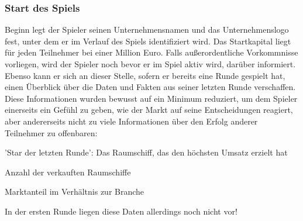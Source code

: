 \subsubsection{Start des Spiels}
\label{sub:spielwelt-regeln-informationsphase-start_des_spiels}

Beginn legt der Spieler seinen Unternehmensnamen und das Unternehmenslogo fest, unter dem er im Verlauf des Spiels identifiziert wird. Das Startkapital liegt für jeden Teilnehmer bei einer Million Euro. Falls außerordentliche Vorkommnisse vorliegen, wird der Spieler noch bevor er im Spiel aktiv wird, darüber informiert. Ebenso kann er sich an dieser Stelle, sofern er bereits eine Runde gespielt hat, einen Überblick über die Daten und Fakten aus seiner letzten Runde verschaffen. Diese Informationen wurden bewusst auf ein Minimum reduziert, um dem Spieler einerseits ein Gefühl zu geben, wie der Markt auf seine Entscheidungen reagiert, aber andererseits nicht zu viele Informationen über den Erfolg anderer Teilnehmer zu offenbaren:

\begin{seList}
\item 'Star der letzten Runde': Das Raumschiff, das den höchsten Umsatz erzielt hat
\item Anzahl der verkauften Raumschiffe
\item Marktanteil im Verhältnis zur Branche
\end{seList}

In der ersten Runde liegen diese Daten allerdings noch nicht vor! 